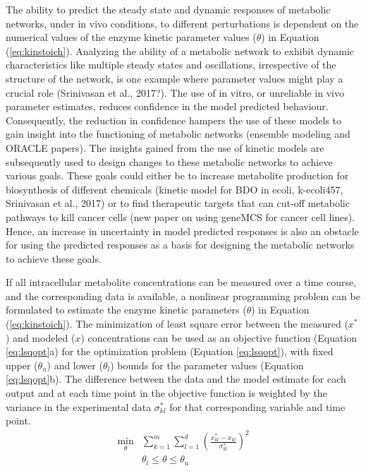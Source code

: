 \documentclass[10pt]{article}
\begin{document}
The ability to predict the steady state and dynamic responses of metabolic networks, under in vivo conditions, to different perturbations is dependent on the numerical values of the enzyme kinetic parameter values ($\theta$) in Equation (\ref{eq:kinstoich}). Analyzing the ability of a metabolic network to exhibit dynamic characteristics like multiple steady states and oscillations, irrespective of the structure of the network, is one example where parameter values might play a crucial role (Srinivasan et al., 2017?). The use of in vitro, or unreliable in vivo parameter estimates, reduces confidence in the model predicted behaviour. Consequently, the reduction in confidence hampers the use of these models to gain insight into the functioning of metabolic networks (ensemble modeling and ORACLE papers). The insights gained from the use of kinetic models are subsequently used to design changes to these metabolic networks to achieve various goals. These goals could either be to increase metabolite production for biosynthesis of different chemicals (kinetic model for BDO in ecoli, k-ecoli457, Srinivasan et al., 2017) or to find therapeutic targets that can cut-off metabolic pathways to kill cancer cells (new paper on using geneMCS for cancer cell lines). Hence, an increase in uncertainty in model predicted responses is also an obstacle for using the predicted responses as a basis for designing the metabolic networks to achieve these goals.  

If all intracellular metabolite concentrations can be measured over a time course, and the corresponding data is available, a nonlinear programming problem can be formulated to estimate the enzyme kinetic parameters ($\theta$) in Equation (\ref{eq:kinstoich}). The minimization of least square error between the measured ($x^*$) and modeled ($x$) concentrations can be used as an objective function (Equation \ref{eq:lsqopt}a) for the optimization problem (Equation \ref{eq:lsqopt}), with fixed upper ($\theta_u$) and lower ($\theta_l$) bounds for the parameter values (Equation \ref{eq:lsqopt}b). The difference between the data and the model estimate for each output and at each time point in the objective function is weighted by the variance in the experimental data $\sigma_{kl}^*$ for that corresponding variable and time point.
\begin{subequations}\label{eq:lsqopt}
	\begin{align}
	\underset{\theta}{\mathrm{min}} &\sum_{k=1}^{m}\sum_{l=1}^{d}\left(\frac{x_{kl}^*-x_{kl}}{\sigma_{kl}^*}\right)^2\\
	&\theta_l \le \theta \le \theta_u
	\end{align}
\end{subequations}
\end{document}
